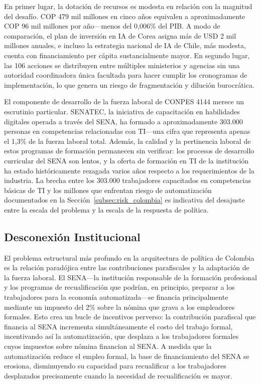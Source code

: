 \documentclass{article}
\begin{document}
En primer lugar, la dotaci\'on de recursos es modesta en relaci\'on con la magnitud del desaf\'io. COP 479 mil millones en cinco a\~nos equivalen a aproximadamente COP 96 mil millones por a\~no---menos del 0,006\% del PIB. A modo de comparaci\'on, el plan de inversi\'on en IA de Corea asigna m\'as de USD 2 mil millones anuales, e incluso la estrategia nacional de IA de Chile, m\'as modesta, cuenta con financiamiento per c\'apita sustancialmente mayor. En segundo lugar, las 106 acciones se distribuyen entre m\'ultiples ministerios y agencias sin una autoridad coordinadora \'unica facultada para hacer cumplir los cronogramas de implementaci\'on, lo que genera un riesgo de fragmentaci\'on y diluci\'on burocr\'atica.

El componente de desarrollo de la fuerza laboral de CONPES 4144 merece un escrutinio particular. SENATEC, la iniciativa de capacitaci\'on en habilidades digitales operada a trav\'es del SENA, ha formado a aproximadamente 303.000 personas en competencias relacionadas con TI---una cifra que representa apenas el 1,3\% de la fuerza laboral total. Adem\'as, la calidad y la pertinencia laboral de estos programas de formaci\'on permanecen sin verificar: los procesos de desarrollo curricular del SENA son lentos, y la oferta de formaci\'on en TI de la instituci\'on ha estado hist\'oricamente rezagada varios a\~nos respecto a los requerimientos de la industria. La brecha entre los 303.000 trabajadores capacitados en competencias b\'asicas de TI y los millones que enfrentan riesgo de automatizaci\'on documentados en la Secci\'on~\ref{subsec:risk_colombia} es indicativa del desajuste entre la escala del problema y la escala de la respuesta de pol\'itica.

\subsection{Desconexi\'on Institucional}
\label{subsec:disconnect}

El problema estructural m\'as profundo en la arquitectura de pol\'itica de Colombia es la relaci\'on parad\'ojica entre las contribuciones parafiscales y la adaptaci\'on de la fuerza laboral. El SENA---la instituci\'on responsable de la formaci\'on profesional y los programas de recualificaci\'on que podr\'ian, en principio, preparar a los trabajadores para la econom\'ia automatizada---se financia principalmente mediante un impuesto del 2\% sobre la n\'omina que grava a los empleadores formales. Esto crea un bucle de incentivos perverso: la contribuci\'on parafiscal que financia al SENA incrementa simult\'aneamente el costo del trabajo formal, incentivando as\'i la automatizaci\'on, que desplaza a los trabajadores formales cuyos impuestos sobre n\'omina financian al SENA. A medida que la automatizaci\'on reduce el empleo formal, la base de financiamiento del SENA se erosiona, disminuyendo su capacidad para recualificar a los trabajadores desplazados precisamente cuando la necesidad de recualificaci\'on es mayor.
\end{document}
